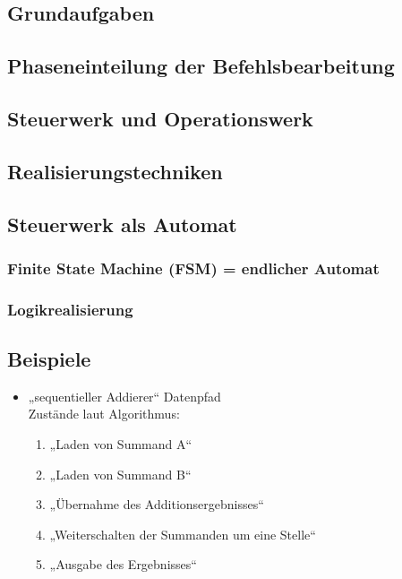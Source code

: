 \subsection*{Grundaufgaben}
\subsection*{Phaseneinteilung der Befehlsbearbeitung}
\subsection*{Steuerwerk und Operationswerk}
\subsection*{Realisierungstechniken}

\subsection{Steuerwerk als Automat}
\subsubsection*{Finite State Machine (FSM) = endlicher Automat}
\subsubsection*{Logikrealisierung}

\subsection*{Beispiele}
\begin{itemize}
\item „sequentieller Addierer“ Datenpfad\\
Zustände laut Algorithmus:
\begin{enumerate}
\item „Laden von Summand A“
\item „Laden von Summand B“
\item „Übernahme des Additionsergebnisses“
\item „Weiterschalten der Summanden um eine Stelle“
\item „Ausgabe des Ergebnisses“
\end{enumerate}
\end{itemize}

